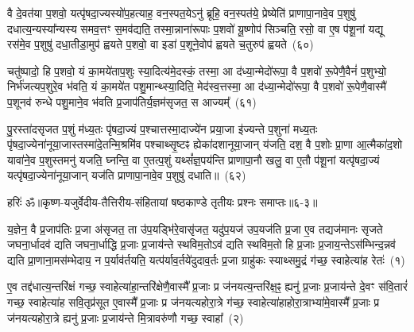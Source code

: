 वै दे॒वत॑या प॒शवो॒ यत्पृ॑षदा॒ज्यस्यो॑प॒हत्याह॒ वन॒स्पत॒ये\-ऽनु॑ ब्रूहि॒ वन॒स्पत॑ये॒ प्रेष्येति॑ प्राणापा॒नावे॒व प॒शुषु॑ दधात्य॒न्यस्या᳚न्यस्य समव॒त्तꣳ स॒मव॑द्यति॒ तस्मा॒न्नाना॑रूपाः प॒शवो॑ यू॒ष्णोप॑ सिञ्चति॒ रसो॒ वा ए॒ष प॑शू॒नां यद्यू रस॑मे॒व प॒शुषु॑ दधा॒तीडा॒मुप॑ ह्वयते प॒शवो॒ वा इडा॑ प॒शूने॒वोप॑ ह्वयते च॒तुरुप॑ ह्वयते~(६०)

चतु॑ष्पादो॒ हि प॒शवो॒ यं का॒मये॑ताप॒शुः स्या॒दित्य॑मे॒दस्कं॒ तस्मा॒ आ द॑ध्या॒न्मेदो॑रूपा॒ वै प॒शवो॑ रू॒पेणै॒वैनं॑ प॒शुभ्यो॒ निर्भ॑जत्यप॒शुरे॒व भ॑वति॒ यं का॒मये॑त पशु॒मान्थ्स्या॒दिति॒ मेद॑स्व॒त्तस्मा॒ आ द॑ध्या॒न्मेदो॑रूपा॒ वै प॒शवो॑ रू॒पेणै॒वास्मै॑ प॒शूनव॑ रुन्धे पशु॒माने॒व भ॑वति प्र॒जा\-प॑तिर्य॒ज्ञम॑सृजत॒ स आज्यम्᳚~(६१)

पु॒रस्ता॑दसृजत प॒शुं म॑ध्य॒तः पृ॑षदा॒ज्यं प॒श्चात्तस्मा॒दाज्ये॑न प्रया॒जा इ॑ज्यन्ते प॒शुना॑ मध्य॒तः पृ॑षदा॒ज्येना॑नूया॒जास्तस्मा॑दे॒तन्मि॒श्रमि॑व पश्चाथ्सृ॒ष्टꣴ ह्येका॑\-दशानूया॒जान् य॑जति॒ दश॒ वै प॒शोः प्रा॒णा आ॒त्मैका॑द॒शो यावा॑ने॒व प॒शुस्तमनु॑ यजति॒ घ्नन्ति॒ वा ए॒तत्प॒शुं यथ्सं᳚ज्ञ॒पय॑न्ति प्राणापा॒नौ खलु॒ वा ए॒तौ प॑शू॒नां यत्पृ॑षदा॒ज्यं यत्पृ॑षदा॒ज्येना॑नूया॒जान् यज॑ति प्राणापा॒नावे॒व प॒शुषु॑ दधाति॥~(६२)

{\anuvakamend[{घ्नन्ति॒ यन्तं॒ खलु॑ च॒तुरुप॑ ह्वयत॒ आज्यं॒ यत्पृ॑षदा॒ज्येन॒ षट्च॑}]}%

{हरिः॑ ॐ}{॥कृष्ण-यजुर्वेदीय-तैत्तिरीय-संहितायां षष्ठकाण्डे तृतीयः प्रश्नः समाप्तः॥६-३॥}

\setcounter{anuvakam}{0}
य॒ज्ञेन॒ वै प्र॒जा\-प॑तिः प्र॒जा अ॑सृजत॒ ता उ॑प॒यड्भि॑रे॒वासृ॑जत॒ यदु॑प॒यज॑ उप॒यज॑ति प्र॒जा ए॒व तद्यज॑मानः सृजते जघना॒र्धादव॑ द्यति जघना॒र्धाद्धि प्र॒जाः प्र॒जाय॑न्ते स्थविम॒तो\-ऽव॑ द्यति स्थविम॒तो हि प्र॒जाः प्र॒जाय॒न्ते\-ऽस॑म्भिन्द॒न्नव॑ द्यति प्रा॒णाना॒मस॑म्भेदाय॒ न प॒र्याव॑र्तयति॒ यत्प॑र्याव॒र्तये॑दुदाव॒र्तः प्र॒जा ग्राहु॑कः स्याथ्समु॒द्रं ग॑च्छ॒ स्वाहेत्या॑ह रेतः॑~(१)

ए॒व तद्द॑धात्य॒न्तरि॑क्षं गच्छ॒ स्वाहेत्या॑हा॒न्तरि॑क्षेणै॒वास्मै᳚ प्र॒जाः प्र ज॑नयत्य॒न्तरि॑क्ष॒ꣴ॒ ह्यनु॑ प्र॒जाः प्र॒जाय॑न्ते दे॒वꣳ स॑वि॒तारं॑ गच्छ॒ स्वाहेत्या॑ह सवि॒तृप्र॑सूत ए॒वास्मै᳚ प्र॒जाः प्र ज॑नयत्यहोरा॒त्रे ग॑च्छ॒ स्वाहेत्या॑हाहोरा॒त्राभ्या॑मे॒वास्मै᳚ प्र॒जाः प्र ज॑नयत्यहोरा॒त्रे ह्यनु॑ प्र॒जाः प्र॒जाय॑न्ते मि॒त्रावरु॑णौ गच्छ॒ स्वाहा᳚~(२)

